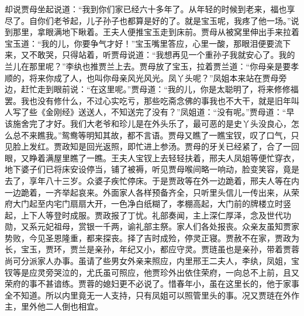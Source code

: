 


\begin{parag}
    却说贾母坐起说道：“我到你们家已经六十多年了。从年轻的时候到老来，福也享尽了。自你们老爷起，儿子孙子也都算是好的了。就是宝玉呢，我疼了他一场。”说到那里，拿眼满地下瞅着。王夫人便推宝玉走到床前。贾母从被窝里伸出手来拉着宝玉道：“我的儿，你要争气才好！”宝玉嘴里答应，心里一酸，那眼泪便要流下来，又不敢哭，只得站着，听贾母说道：“我想再见一个重孙子我就安心了。我的兰儿在那里呢？”李纨也推贾兰上去。贾母放了宝玉，拉着贾兰道：“你母亲是要孝顺的，将来你成了人，也叫你母亲风光风光。凤丫头呢？”凤姐本来站在贾母旁边，赶忙走到眼前说：“在这里呢。”贾母道：“我的儿，你是太聪明了，将来修修福罢。我也没有修什么，不过心实吃亏，那些吃斋念佛的事我也不大干，就是旧年叫人写了些《金刚经》送送人，不知送完了没有？”凤姐道：“没有呢。”贾母道：“早该施舍完了才好。我们大老爷和珍儿是在外头乐了，最可恶的是史丫头没良心，怎么总不来瞧我。”鸳鸯等明知其故，都不言语。贾母又瞧了一瞧宝钗，叹了口气，只见脸上发红。贾政知是回光返照，即忙进上参汤。贾母的牙关已经紧了，合了一回眼，又睁着满屋里瞧了一瞧。王夫人宝钗上去轻轻扶着，邢夫人凤姐等便忙穿衣，地下婆子们已将床安设停当，铺了被褥，听见贾母喉间略一响动，脸变笑容，竟是去了，享年八十三岁。众婆子疾忙停床。于是贾政等在外一边跪着，邢夫人等在内一边跪着，一齐举起哀来。外面家人各样预备齐全，只听里头信儿一传出来，从荣府大门起至内宅门扇扇大开，一色净白纸糊了，孝棚高起，大门前的牌楼立时竖起，上下人等登时成服。贾政报了丁忧。礼部奏闻，主上深仁厚泽，念及世代功勋，又系元妃祖母，赏银一千两，谕礼部主祭。家人们各处报丧。众亲友虽知贾家势败，今见圣恩隆重，都来探丧。择了吉时成殓，停灵正寝。贾赦不在家，贾政为长，宝玉，贾环，贾兰是亲孙，年纪又小，都应守灵。贾琏虽也是亲孙，带着贾蓉尚可分派家人办事。虽请了些男女外亲来照应，内里邢王二夫人，李纨，凤姐，宝钗等是应灵旁哭泣的，尤氏虽可照应，他贾珍外出依住荣府，一向总不上前，且又荣府的事不甚谙练。贾蓉的媳妇更不必说了。惜春年小，虽在这里长的，他于家事全不知道。所以内里竟无一人支持，只有凤姐可以照管里头的事。况又贾琏在外作主，里外他二人倒也相宜。
\end{parag}


